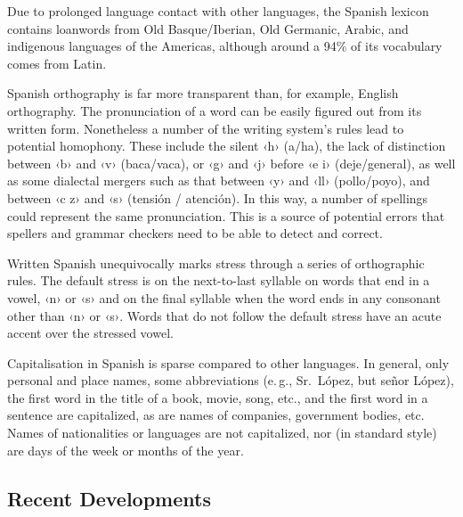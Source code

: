 \begin{multicols}{2}
Due to prolonged language contact with other languages, the Spanish lexicon contains loanwords from Old Basque/Iberian, Old Germanic, Arabic, and indigenous languages of the Americas, although around a 94\% of its vocabulary comes from Latin.

Spanish orthography is far more transparent than, for example, English orthography.  The pronunciation of a word can be easily figured out from its written form. Nonetheless a number of the writing system's rules lead to potential homophony. These include the silent ‹h› (a/ha), the lack of distinction between ‹b› and ‹v› (baca/vaca), or ‹g› and ‹j› before ‹e i› (deje/general), as well as some dialectal mergers such as that between ‹y› and ‹ll› (pollo/poyo), and between ‹c z› and ‹s› (tensión / atención). In this way, a number of spellings could represent the same pronunciation. This is a source of potential errors that spellers and grammar checkers need to be able to detect and correct.

Written Spanish unequivocally marks stress through a series of orthographic rules. The default stress is on the next-to-last syllable on words that end in a vowel, ‹n› or ‹s› and on the final syllable when the word ends in any consonant other than ‹n› or ‹s›. Words that do not follow the default stress have an acute accent over the stressed vowel.

Capitalisation in Spanish is sparse compared to other languages. In general, only personal and place names, some abbreviations (e.\,g., Sr.~López, but señor López), the first word in the title of a book, movie, song, etc., and the first word in a sentence are capitalized, as are names of companies, government bodies, etc. Names of nationalities or languages are not capitalized, nor (in standard style) are days of the week or months of the year.


\subsection{Recent Developments}


\end{multicols}
